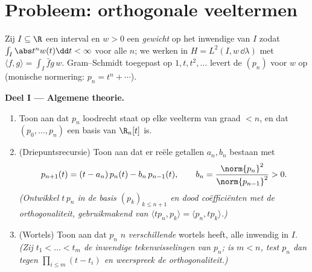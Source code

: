 \section{Probleem: orthogonale veeltermen}

\begin{problem}\label{pb:b3:hilbert:1}
Zij $I \subseteq \R$ een interval en $w > 0$ een 
\emph{gewicht} op het inwendige van $I$ zodat $\int_I \abs
t^nw(t)\dd t < \infty$ voor alle $n$; we werken in $H = L^2(I,
w\,\dd\lambda)$ met $\langle f, g\rangle = \int_I \bar fg\,w$.
Gram--Schmidt toegepast op $1, t, t^2, \dots$ levert de
\emph{} $(p_n)$ voor $w$ op (monische
normering: $p_n = t^n + \cdots$).

\medskip
\noindent\textbf{Deel I --- Algemene theorie.}
\begin{enumerate}
  \item Toon aan dat $p_n$ loodrecht staat op elke veelterm van
        graad $< n$, en dat $(p_0, \dots, p_n)$ een basis van
        $\R_n[t]$ is.
  \item (Driepuntsrecursie) Toon aan dat er reële getallen $a_n,
        b_n$ bestaan met
        \[
        p_{n+1}(t) = (t - a_n)\,p_n(t) - b_n\,p_{n-1}(t),
        \qquad b_n = \frac{\norm{p_n}^2}{\norm{p_{n-1}}^2} >
        0 .
        \]
        \emph{(Ontwikkel $t\,p_n$ in de basis $(p_k)_{k \leq
        n+1}$ en dood coëfficiënten met de orthogonaliteit,
        gebruikmakend van $\langle tp_n, p_k\rangle = \langle
        p_n, tp_k\rangle$.)}
  \item (Wortels) Toon aan dat $p_n$ $n$ \emph{verschillende}
        wortels heeft, alle inwendig in $I$. \emph{(Zij $t_1 <
        \dots < t_m$ de inwendige tekenwisselingen van $p_n$; is
        $m < n$, test $p_n$ dan tegen $\prod_{i\leq m}(t - t_i)$
        en weerspreek de orthogonaliteit.)}
\end{enumerate}


\end{problem}
